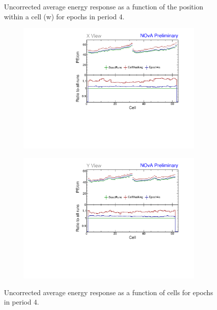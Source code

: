 \begin{figure}[!hbtp]
\begin{subfigure}[b]{0.495\textwidth}
\end{subfigure}
\caption{Uncorrected average energy response as a function of the position within a cell (w) for epochs in period 4.}
\label{fig:CalibhistWPE_period4}
\end{figure}

\begin{figure}[!hbtp]
\centering
\begin{subfigure}[b]{0.495\textwidth}
\centering
\includegraphics[width=\textwidth]{PlotsTBCalibTechnote/Attenprofs_P4Data_CellPE_X_Combined.pdf}
\end{subfigure}
\begin{subfigure}[b]{0.495\textwidth}
\centering
\includegraphics[width=\textwidth]{PlotsTBCalibTechnote/Attenprofs_P4Data_CellPE_Y_Combined.pdf}
\end{subfigure}
\caption{Uncorrected average energy response as a function of cells for epochs in period 4.}
\label{fig:CalibhistCellPE_period4}
\end{figure}

